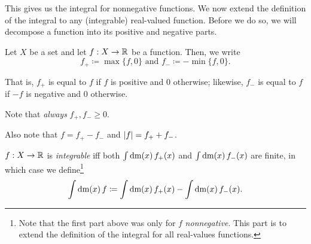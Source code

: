 This gives us the integral for nonnegative functions.  We now extend the definition of the integral to any (integrable) real-valued function.  Before we do so, we will decompose a function into its positive and negative parts.
\begin{dfn}
Let $X$ be a set and let $f:X\rightarrow \mathbb{R}$ be a function.  Then, we write
\begin{equation}
f_+\coloneqq \max \{ f,0\} \text{ and }f_-\coloneqq -\min \{ f,0\} .
\end{equation}
\begin{rmk}
That is, $f_+$ is equal to $f$ if $f$ is positive and $0$ otherwise; likewise, $f_-$ is equal to $f$ if $-f$ is negative and $0$ otherwise.
\end{rmk}
\begin{rmk}
Note that \emph{always} $f_+,f_-\geq 0$.
\end{rmk}
\begin{rmk}
Also note that $f=f_+-f_-$ and $\lvert f\rvert=f_++f_-$.
\end{rmk}
\end{dfn}
\begin{dfn}[Integrable]
$f:X\rightarrow \mathbb{R}$ is \emph{integrable} iff both $\int \mathop{}\!\mathrm{d} \mathrm{m} (x)\, f_+(x)$ and $\int \mathop{}\!\mathrm{d} \mathrm{m} (x)\, f_-(x)$ are finite, in which case we define\footnote{Note that the first part above was only for $f$ \emph{nonnegative}.  This part is to extend the definition of the integral for all real-values functions.}
\begin{equation}
\int \mathop{}\!\mathrm{d} \mathrm{m} (x)\, f\coloneqq \int \mathop{}\!\mathrm{d} \mathrm{m} (x)\, f_+(x)-\int \mathop{}\!\mathrm{d} \mathrm{m} (x)\, f_-(x).
\end{equation}
\end{dfn}
